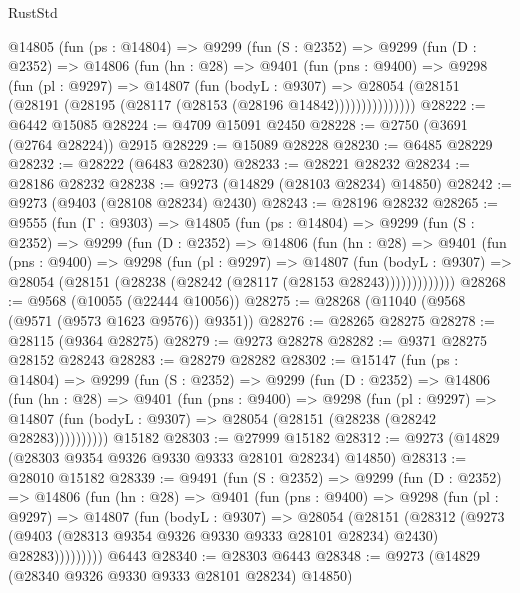 \begin{lexlean}{RustStd}
\begin{coremodule}
      @14805
        (fun (ps : @14804) =>
        @9299
          (fun (S : @2352) =>
          @9299
            (fun (D : @2352) =>
            @14806
              (fun (hn : @28) =>
              @9401
                (fun (pns : @9400) =>
                @9298
                  (fun (pl : @9297) =>
                  @14807
                    (fun (bodyL : @9307) =>
                    @28054 (@28151 (@28191 (@28195 (@28117 (@28153 (@28196 @14842)))))))))))))))
@28222 := @6442 @15085
@28224 := @4709 @15091 @2450
@28228 := @2750 (@3691 (@2764 @28224)) @2915
@28229 := @15089 @28228
@28230 := @6485 @28229
@28232 := @28222 (@6483 @28230)
@28233 := @28221 @28232
@28234 := @28186 @28232
@28238 := @9273 (@14829 (@28103 @28234) @14850)
@28242 := @9273 (@9403 (@28108 @28234) @2430)
@28243 := @28196 @28232
@28265 := @9555
    (fun (Γ : @9303) =>
    @14805
      (fun (ps : @14804) =>
      @9299
        (fun (S : @2352) =>
        @9299
          (fun (D : @2352) =>
          @14806
            (fun (hn : @28) =>
            @9401
              (fun (pns : @9400) =>
              @9298
                (fun (pl : @9297) =>
                @14807
                  (fun (bodyL : @9307) =>
                  @28054 (@28151 (@28238 (@28242 (@28117 (@28153 @28243)))))))))))))
@28268 := @9568 (@10055 (@22444 @10056))
@28275 := @28268 (@11040 (@9568 (@9571 (@9573 @1623 @9576)) @9351))
@28276 := @28265 @28275
@28278 := @28115 (@9364 @28275)
@28279 := @9273 @28278
@28282 := @9371 @28275 @28152 @28243
@28283 := @28279 @28282
@28302 := @15147
    (fun (ps : @14804) =>
    @9299
      (fun (S : @2352) =>
      @9299
        (fun (D : @2352) =>
        @14806
          (fun (hn : @28) =>
          @9401
            (fun (pns : @9400) =>
            @9298
              (fun (pl : @9297) =>
              @14807 (fun (bodyL : @9307) => @28054 (@28151 (@28238 (@28242 @28283))))))))))
    @15182
@28303 := @27999 @15182
@28312 := @9273 (@14829 (@28303 @9354 @9326 @9330 @9333 @28101 @28234) @14850)
@28313 := @28010 @15182
@28339 := @9491
    (fun (S : @2352) =>
    @9299
      (fun (D : @2352) =>
      @14806
        (fun (hn : @28) =>
        @9401
          (fun (pns : @9400) =>
          @9298
            (fun (pl : @9297) =>
            @14807
              (fun (bodyL : @9307) =>
              @28054
                (@28151
                  (@28312
                    (@9273
                      (@9403 (@28313 @9354 @9326 @9330 @9333 @28101 @28234) @2430)
                      @28283)))))))))
    @6443
@28340 := @28303 @6443
@28348 := @9273 (@14829 (@28340 @9326 @9330 @9333 @28101 @28234) @14850)

\end{coremodule}
\end{lexlean}
